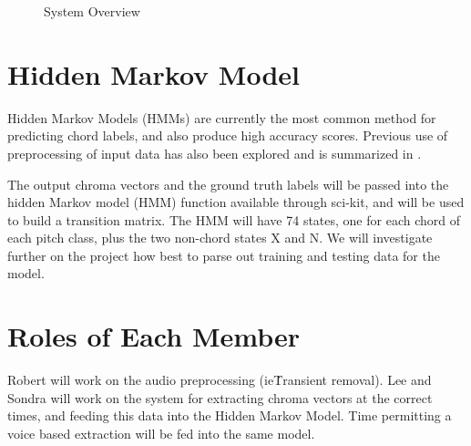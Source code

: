 \documentclass{article}
\begin{document}
\begin{figure}
\caption{System Overview}
\end{figure}

\section{Hidden Markov Model}

Hidden Markov Models (HMMs) are currently the most common method for predicting
chord labels, and also produce high accuracy scores. Previous use of
preprocessing of input data has also been explored and is summarized in
\cite{McVicar:00}.

The output chroma vectors and the ground truth labels will be passed into the
hidden Markov model (HMM) function available through sci-kit, and will be used
to build a transition matrix. The HMM will have 74 states, one for each chord
of each pitch class, plus the two non-chord states X and N. We will investigate
further on the project how best to parse out training and testing data for the
model.

\section{Roles of Each Member}

Robert will work on the audio preprocessing (ie\. Transient removal).  Lee and
Sondra will work on the system for extracting chroma vectors at the correct
times, and feeding this data into the Hidden Markov Model. Time permitting a
voice based extraction will be fed into the same model.
\end{document}

